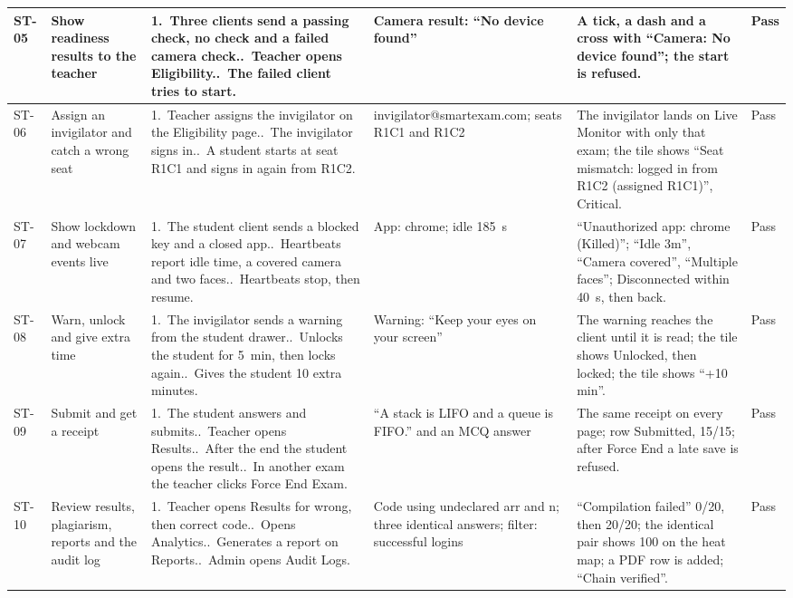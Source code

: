 {\begin{longtable}{Q}
ST-05 & Show readiness results to the teacher & 1.~Three clients send a passing check, no check and a failed camera check..~Teacher opens Eligibility..~The failed client tries to start. & Camera result: ``No device found'' & A tick, a dash and a cross with ``Camera: No device found''; the start is refused. & Pass\\ \hline
ST-06 & Assign an invigilator and catch a wrong seat & 1.~Teacher assigns the invigilator on the Eligibility page..~The invigilator signs in..~A student starts at seat R1C1 and signs in again from R1C2. & invigilator@\allowbreak{}smartexam.com; seats R1C1 and R1C2 & The invigilator lands on Live Monitor with only that exam; the tile shows ``Seat mismatch: logged in from R1C2 (assigned R1C1)'', Critical. & Pass\\ \hline
ST-07 & Show lockdown and webcam events live & 1.~The student client sends a blocked key and a closed app..~Heartbeats report idle time, a covered camera and two faces..~Heartbeats stop, then resume. & App: chrome; idle 185~s & ``Unauthorized app: chrome (Killed)''; ``Idle 3m'', ``Camera covered'', ``Multiple faces''; Disconnected within 40~s, then back. & Pass\\ \hline
ST-08 & Warn, unlock and give extra time & 1.~The invigilator sends a warning from the student drawer..~Unlocks the student for 5~min, then locks again..~Gives the student 10 extra minutes. & Warning: ``Keep your eyes on your screen'' & The warning reaches the client until it is read; the tile shows Unlocked, then locked; the tile shows ``+10 min''. & Pass\\ \hline
ST-09 & Submit and get a receipt & 1.~The student answers and submits..~Teacher opens Results..~After the end the student opens the result..~In another exam the teacher clicks Force End Exam. & ``A stack is LIFO and a queue is FIFO.'' and an MCQ answer & The same receipt on every page; row Submitted, 15/15; after Force End a late save is refused. & Pass\\ \hline
ST-10 & Review results, plagiarism, reports and the audit log & 1.~Teacher opens Results for wrong, then correct code..~Opens Analytics..~Generates a report on Reports..~Admin opens Audit Logs. & Code using undeclared arr and n; three identical answers; filter: successful logins & ``Compilation failed'' 0/20, then 20/20; the identical pair shows 100 on the heat map; a PDF row is added; ``Chain verified''. & Pass\\
\end{longtable}}

